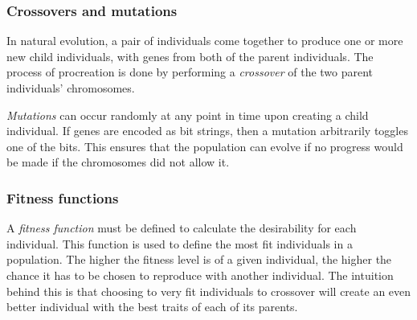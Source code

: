 
\subsubsection{Crossovers and mutations}
In natural evolution, a pair of individuals come together to produce one or more new child individuals, with genes from both of the parent individuals. The process of procreation is done by performing a \emph{crossover} of the two parent individuals' chromosomes.



\emph{Mutations} can occur randomly at any point in time upon creating a child individual. If genes are encoded as bit strings, then a mutation arbitrarily toggles one of the bits. This ensures that the population can evolve if no progress would be made if the chromosomes did not allow it.

\subsubsection{Fitness functions}
A \emph{fitness function} must be defined to calculate the desirability for each individual. This function is used to define the most fit individuals in a population. The higher the fitness level is of a given individual, the higher the chance it has to be chosen to reproduce with another individual. The intuition behind this is that choosing to very fit individuals to crossover will create an even better individual with the best traits of each of its parents.




